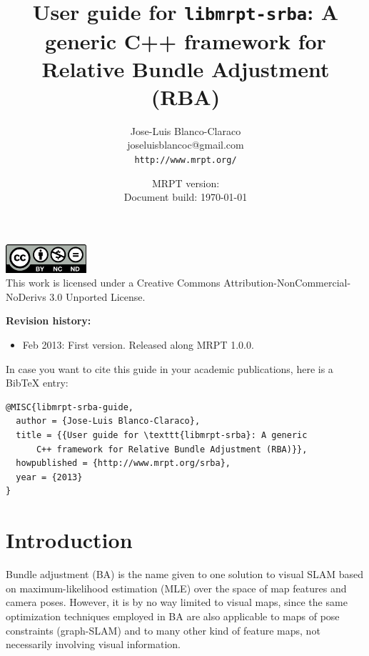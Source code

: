 \documentclass[a4paper,11pt]{article}
\title{User guide for \texttt{libmrpt-srba}: A generic C++ framework for Relative Bundle Adjustment (RBA)}
\author{Jose-Luis Blanco-Claraco \\ joseluisblancoc@gmail.com \\ \texttt{http://www.mrpt.org/} }
\date{MRPT version: \MRPTVERSION \\ Document build: \today }
\begin{document}
\maketitle


\vfill

\begin{scriptsize}
\begin{center}
\includegraphics[width=3cm]{imgs/by-nc-nd-eu.pdf}
\\
This work is licensed under a Creative Commons Attribution-NonCommercial-NoDerivs 3.0 Unported License.
\end{center}
\end{scriptsize}

\vspace{1cm}

\newpage

\textbf{Revision history:}
\begin{itemize}
 \item Feb 2013: First version. Released along MRPT 1.0.0.
\end{itemize}

\vfill


\begin{small}
In case you want to cite this guide in your academic publications, here is a BibTeX entry: 

\begin{verbatim}
@MISC{libmrpt-srba-guide,
  author = {Jose-Luis Blanco-Claraco},
  title = {{User guide for \texttt{libmrpt-srba}: A generic 
      C++ framework for Relative Bundle Adjustment (RBA)}},
  howpublished = {http://www.mrpt.org/srba},
  year = {2013}
} 
\end{verbatim} 

\end{small}

\vspace{1cm}

\newpage
\tableofcontents
\newpage

\section{Introduction}

Bundle adjustment (BA) is the name given to one solution to visual SLAM based on maximum-likelihood estimation (MLE) 
over the space of map features and camera poses. However, it is by no way limited to visual maps, since the same 
optimization techniques employed in BA are also applicable to maps of pose constraints (graph-SLAM) and to many other 
kind of feature maps, not necessarily involving visual information.
\end{document}
